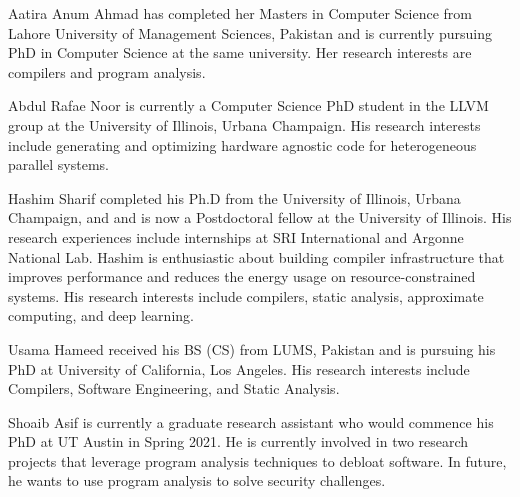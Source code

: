 \documentclass[10pt,journal,compsoc]{IEEEtran}
\begin{document}


\newpage
\begin{IEEEbiographynophoto}{Aatira Anum Ahmad}
has completed her Masters in Computer Science from Lahore University of Management Sciences, Pakistan and is currently pursuing PhD in Computer Science at the same university. Her research interests are compilers and program analysis. 
\end{IEEEbiographynophoto}


\begin{IEEEbiographynophoto}{Abdul Rafae Noor}
is currently a Computer Science PhD student in the LLVM group at the University of Illinois, Urbana Champaign. His research interests include generating and optimizing hardware agnostic code for heterogeneous parallel systems.
\end{IEEEbiographynophoto}

\begin{IEEEbiographynophoto}{Hashim Sharif} completed his Ph.D from the University of Illinois, Urbana Champaign, and and is now a Postdoctoral fellow at the University of Illinois.
His research experiences include internships at SRI International and Argonne National Lab. Hashim is enthusiastic about building compiler infrastructure that improves performance and 
reduces the energy usage on resource-constrained systems. His research interests include compilers, static analysis, approximate computing, and deep learning.

\end{IEEEbiographynophoto}

\begin{IEEEbiographynophoto}{Usama Hameed}
received his BS (CS) from LUMS, Pakistan and is pursuing his PhD at University of California, Los Angeles. His research interests include Compilers, Software Engineering, and Static Analysis.
\end{IEEEbiographynophoto}

\begin{IEEEbiographynophoto}{Shoaib Asif}
is currently a graduate research assistant who would commence his PhD at UT Austin in Spring 2021. He is currently involved in two research projects that leverage program analysis techniques to debloat software. In future, he wants to use program analysis to solve security challenges.\end{IEEEbiographynophoto}
\end{document}

